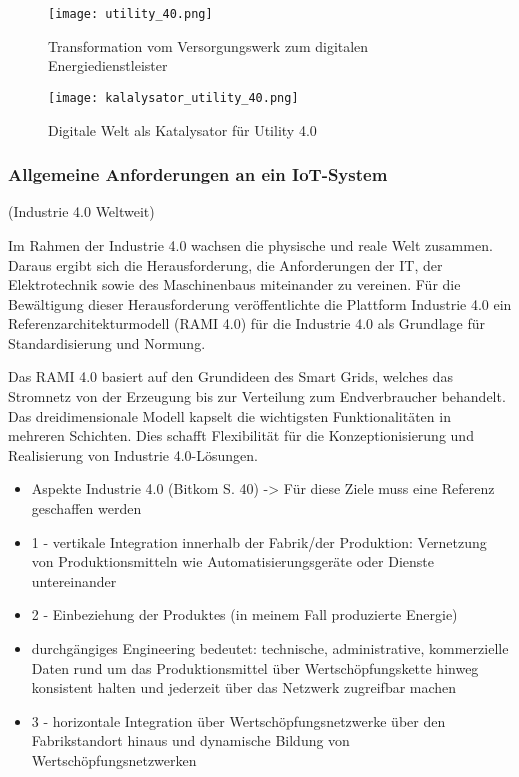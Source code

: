 \begin{figure}[h]
  \texttt{[image: utility\_40.png]}
  \caption[Transformation vom Versorgungswerk zum digitalen Energiedienstleister]{Transformation vom Versorgungswerk zum digitalen Energiedienstleister \citep[S. 13]{Doleski2016}}
\end{figure}

\begin{figure}[h]
  \texttt{[image: kalalysator\_utility\_40.png]}
  \caption[Digitale Welt als Katalysator für Utility 4.0 ]{Digitale Welt als Katalysator für Utility 4.0 \citep[S. 17]{Doleski2016}}
\end{figure}

\subsubsection{Allgemeine Anforderungen an ein IoT-System}

(Industrie 4.0 Weltweit)


Im Rahmen der Industrie 4.0 wachsen die physische und reale Welt zusammen. Daraus ergibt sich die Herausforderung, die Anforderungen der IT, der Elektrotechnik sowie des Maschinenbaus miteinander zu vereinen. Für die Bewältigung dieser Herausforderung veröffentlichte die Plattform Industrie 4.0 ein Referenzarchitekturmodell (RAMI 4.0) für die Industrie 4.0 als Grundlage für Standardisierung und Normung.

Das RAMI 4.0 basiert auf den Grundideen des Smart Grids, welches das Stromnetz von der Erzeugung bis zur Verteilung zum Endverbraucher behandelt. Das dreidimensionale Modell kapselt die wichtigsten Funktionalitäten in mehreren Schichten. Dies schafft Flexibilität für die Konzeptionisierung und Realisierung von Industrie 4.0-Lösungen.

\begin{itemize}
  \item Aspekte Industrie 4.0 (Bitkom S. 40) -> Für diese Ziele muss eine Referenz geschaffen werden
  \item 1 - vertikale Integration innerhalb der Fabrik/der Produktion: Vernetzung von Produktionsmitteln wie Automatisierungsgeräte oder Dienste untereinander
  \item 2 - Einbeziehung der Produktes (in meinem Fall produzierte Energie)
  \item durchgängiges Engineering bedeutet: technische, administrative, kommerzielle Daten rund um das Produktionsmittel über Wertschöpfungskette hinweg konsistent halten und jederzeit über das Netzwerk zugreifbar machen
  \item 3 - horizontale Integration über Wertschöpfungsnetzwerke über den Fabrikstandort hinaus und dynamische Bildung von Wertschöpfungsnetzwerken
\end{itemize}



